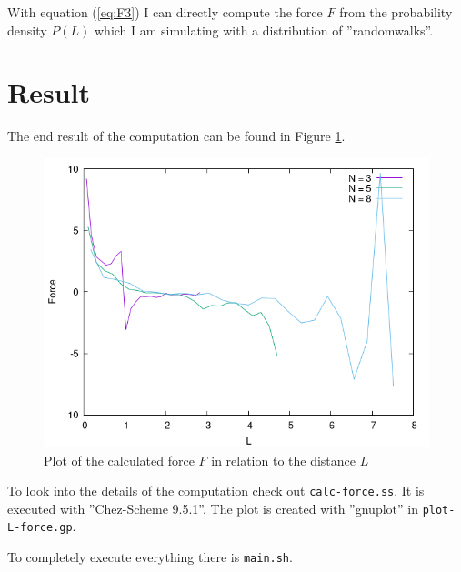 \documentclass[a4paper,12pt]{scrartcl}
\begin{document}
With equation (\ref{eq:F3}) I can directly compute the force $F$ from the probability density $P(L)$ which I am simulating with a distribution of ''randomwalks''.

\section{Result}
The end result of the computation can be found in Figure \ref{fig:1}.

\begin{figure}[h]
	\centering
	\includegraphics[scale=0.65]{../out/plot-L-force.png}
	\caption{Plot of the calculated force $F$ in relation to the distance $L$}
	\label{fig:1}
\end{figure}

To look into the details of the computation check out \texttt{calc-force.ss}. It is executed with ''Chez-Scheme 9.5.1''.
The plot is created with ''gnuplot'' in \texttt{plot-L-force.gp}.

To completely execute everything there is \texttt{main.sh}.
\end{document}
